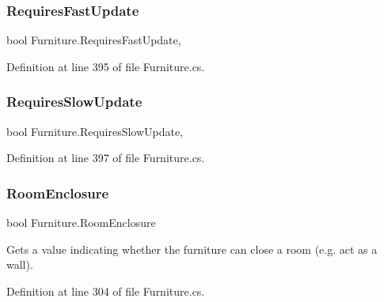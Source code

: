 \mbox{\label{class_furniture_a4ae33e19e8b9e821bd39baca75687699}} 
\subsubsection{\texorpdfstring{Requires\+Fast\+Update}{RequiresFastUpdate}}
{\footnotesize\ttfamily bool Furniture.\+Requires\+Fast\+Update\hspace{0.3cm}{\ttfamily [get]}, {\ttfamily [set]}}



Definition at line 395 of file Furniture.\+cs.

\mbox{\label{class_furniture_ab830f3c4829513c868040619575f0b7e}} 
\subsubsection{\texorpdfstring{Requires\+Slow\+Update}{RequiresSlowUpdate}}
{\footnotesize\ttfamily bool Furniture.\+Requires\+Slow\+Update\hspace{0.3cm}{\ttfamily [get]}, {\ttfamily [set]}}



Definition at line 397 of file Furniture.\+cs.

\mbox{\label{class_furniture_a7672062c7a01115a8010681ef06fa42a}} 
\subsubsection{\texorpdfstring{Room\+Enclosure}{RoomEnclosure}}
{\footnotesize\ttfamily bool Furniture.\+Room\+Enclosure\hspace{0.3cm}{\ttfamily [get]}}



Gets a value indicating whether the furniture can close a room (e.\+g. act as a wall). 



Definition at line 304 of file Furniture.\+cs.

